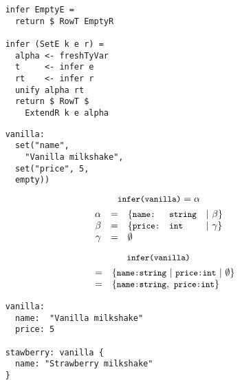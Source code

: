 \documentclass[20pt]{beamer}
\newcommand{\code}[1]{
    \texttt{\small{#1}}
}
\begin{document}
\begin{frame}
    \begin{lstlisting}
    infer EmptyE =
      return $ RowT EmptyR

    infer (SetE k e r) =
      alpha <- freshTyVar
      t     <- infer e
      rt    <- infer r
      unify alpha rt
      return $ RowT $
        ExtendR k e alpha
    \end{lstlisting}
\end{frame}

\begin{frame}
    \begin{lstlisting}
    vanilla:
      set("name",
        "Vanilla milkshake",
      set("price", 5,
      empty))
    \end{lstlisting}
\end{frame}

\begin{frame}
    \[
    \code{infer(vanilla)} = \alpha
    \]
    \[
    \begin{array}{rclll}
    \alpha  & = & \{ \code{name:}  & \code{string} & | ~ \beta  \} \\
    \beta   & = & \{ \code{price:} & \code{int}    & | ~ \gamma \} \\
    \gamma  & = & \emptyset                                        \\
    \end{array}
    \]
\end{frame}

\begin{frame}
    \[
    \code{infer(vanilla)}
    \]
    \[
    \begin{array}{lll}
    ~ & = & \{ \code{name:} \code{string} ~ | ~
               \code{price:} \code{int} ~ | ~ \emptyset \} \\
    ~ & = & \{ \code{name:} \code{string}, ~ \code{price:} \code{int} \} \\
    \end{array}
    \]
\end{frame}

\begin{frame}
    \begin{lstlisting}
    vanilla:
      name:  "Vanilla milkshake"
      price: 5

    stawberry: vanilla {
      name: "Strawberry milkshake"
    }
    \end{lstlisting}
\end{frame}
\end{document}
